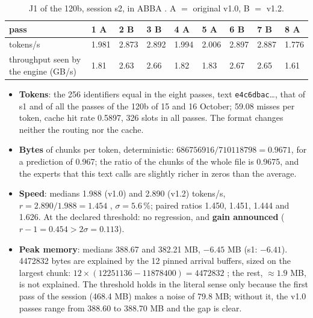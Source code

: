\begin{table}[ht]
\centering\small
\caption[J1 of the 120b, session s2]{J1 of the 120b, session s2, in ABBA \mes. A $=$ original v1.0, B $=$ v1.2.}
\label{t3cod:tab:j1}
\begin{tabular}{@{}lllllllll@{}}
\toprule
pass & 1 A & 2 B & 3 B & 4 A & 5 A & 6 B & 7 B & 8 A \\
\midrule
tokens/s & 1.981 & 2.873 & 2.892 & 1.994 & 2.006 & 2.897 & 2.887 & 1.776 \\
throughput seen by the engine (GB/s) & 1.81 & 2.63 & 2.66 & 1.82 & 1.83 & 2.67 & 2.65 & 1.61 \\
\bottomrule
\end{tabular}
\end{table}

\begin{figure}[tbp]
\centering
\GrapheCodonJalon
{}
\label{fig:t3-codon-jalon}
\end{figure}

\begin{itemize}
\item \textbf{Tokens}: the 256 identifiers equal in the eight passes, text \texttt{e4c6dbac}\dots, that of s1 and of all the passes of the 120b of 15 and 16 October; 59.08 misses per token, cache hit rate 0.5897, 326 slots in all passes. The format changes neither the routing nor the cache.
\item \textbf{Bytes} of chunks per token, deterministic: $\num{686756916}/\num{710118798} = 0.9671$, for a prediction of 0.967; the ratio of the chunks of the whole file is 0.9675, and the experts that this text calls are slightly richer in zeros than the average.
\item \textbf{Speed}: medians 1.988 (v1.0) and 2.890 (v1.2) tokens/s, $r = 2.890/1.988 = 1.454$ \calc, $\sigma = 5.6\,\%$; paired ratios 1.450, 1.451, 1.444 and 1.626. At the declared threshold: no regression, and \textbf{gain announced} ($r - 1 = 0.454 > 2\sigma = 0.113$).
\item \textbf{Peak memory}: medians 388.67 and 382.21 MB, $-6.45$ MB (s1: $-6.41$). \num{4472832} bytes are explained by the 12 pinned arrival buffers, sized on the largest chunk: $12 \times (\num{12251136} - \num{11878400}) = \num{4472832}$ \calc; the rest, $\approx 1.9$ MB, is not explained. The threshold holds in the literal sense only because the first pass of the session (468.4 MB) makes a noise of 79.8 MB; without it, the v1.0 passes range from 388.60 to 388.70 MB and the gap is clear.
\end{itemize}

